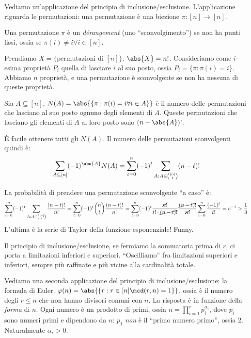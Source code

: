 Vediamo un'applicazione del principio di inclusione/esclusione.
L'applicazione riguarda le permutazioni: una permutazione \`e una biezione $\pi : [n] \to [n]$.
\begin{defn}
	Una permutazione $\pi$ \`e un \emph{d\'erangement} (uno ``sconvolgimento'') se non ha punti fissi, ossia se $\pi(i) \neq i \forall i \in [n]$.
\end{defn}
Prendiamo $X = \{ \text{permutazioni di } [n]\}$.
$\abs{X} = n!$.
Consideriamo come $i$-esima propriet\`a $P_i$ quella di lasciare $i$ al suo posto, ossia $P_i = \{ \pi : \pi(i) = i \}$.
Abbiamo $n$ propriet\`a, e una permutazione \`e sconvolgente se non ha nessuna di queste propriet\`a.

Sia $A \subseteq [n]$, $N(A) = \abs{\{ \pi : \pi(i) = i \forall i \in A \}}$ \`e il numero delle permutazioni che lasciano al suo posto ognuno degli elementi di $A$.
Queste permutazioni che lasciano gli elementi di $A$ al loro posto sono $(n - \abs{A})!$.

\`E facile ottenere tutti gli $N(A)$.
Il numero delle permutazioni sconvolgenti quindi \`e:
\[
	\sum_{A \subseteq [n]} (-1)^{\abs{A}} N(A) =
	\sum_{t = 0}^{n} (-1)^{t} \sum_{A : A \in \binom{[n]}{t}} (n - t)!
\]

La probabilit\`a di prendere una permutazione sconvolgente ``a caso'' \`e:
\[
	\sum_{t = 0}^{n} (-1)^{t} \sum_{A : A \in \binom{[n]}{t}} \frac{(n - t)!}{n!} =
	\sum_{t = 0}^{n} (-1)^{t} \binom{n}{t} \frac{(n-t)!}{n!} =
	\sum_{t = 0}^{n} (-1)^{t} \frac{\cancel{n!}}{t! \cdot \cancel{(n-t)!}} \frac{\cancel{(n-t)!}}{\cancel{n!}}
	\sum_{t = 0}^{n} \frac{(-1)^{t}}{t!} = e^{-1} > \frac{1}{3}
\]
L'ultima \`e la serie di Taylor della funzione esponenziale!
Funny.

Il principio di inclusione/esclusione, se fermiamo la sommatoria prima di $r$, ci porta a limitazioni inferiori e superiori.
``Oscilliamo'' fra limitazioni superiori e inferiori, sempre pi\`u raffinate e pi\`u vicine alla cardinalit\`a totale.

Vediamo una seconda applicazione del principio di inclusione/esclusione: la formula di Euler.
$\varphi(n) = \abs{\{ r : r \in [n] \mcd(r,n) = 1 \}}$, ossia \`e il numero degli $r \le n$ che non hanno divisori comuni con $n$.
La risposta \`e in funzione della \emph{forma} di $n$.
Ogni numero \`e un prodotto di primi, ossia $n = \prod_{i=1}^{r} p_i^{\alpha_i}$, dove $p_i$ sono numeri primi e dipendono da $n$: $p_1$ \emph{non} \`e il ``primo numero primo'', ossia 2.
Naturalmente $\alpha_i > 0$.


